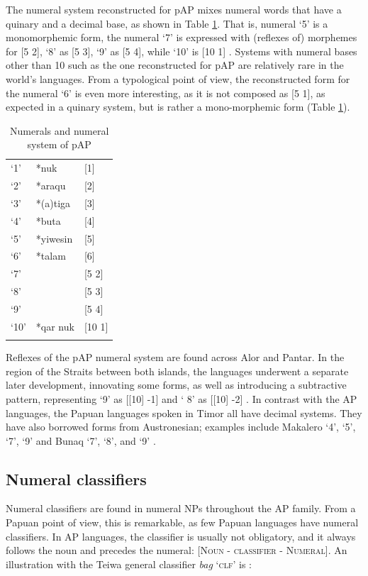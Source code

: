 The numeral system reconstructed for pAP mixes numeral words that have a quinary and a decimal base, as shown in Table \ref{tab:1:11}. That is, numeral `5' is a monomorphemic form, the numeral `7' is expressed with (reflexes of) morphemes for [5 2], `8' as [5 3], `9' as [5 4], while `10' is [10 1] \citep{SchapperEtAlTVnumeralsystems}. Systems with numeral bases other than 10 such as the one reconstructed for pAP are relatively rare in the world's languages. From a typological point of view, the reconstructed form for the numeral `6' is even more interesting, as it is not composed as [5 1], as expected in a quinary system, but is rather a mono-morphemic form (Table \ref{tab:1:11}).


\begin{table}[h]
\caption{Numerals and numeral system of pAP \citep{SchapperEtAlTVnumeralsystems}}
\label{tab:1:11}
\begin{tabular}{lll}      
\mytoprule
`1' & *nuk  &  [1] \\
`2' & *araqu   &  [2] \\
`3' & *(a)tiga  &  [3] \\
`4' & *buta  &  [4] \\
`5' & *yiwesin  &  [5]  \\
`6' & *talam  &  [6] \\
`7' &  &  [5 2] \\
`8' &  &  [5 3] \\
`9' &  &  [5 4] \\
`10' & *qar nuk  & [10 1] \\
\mybottomrule
\end{tabular}
\end{table}

Reflexes of the pAP numeral system are found across Alor and Pantar.  In the region of the Straits between both islands, the languages underwent a separate later development, innovating some forms, as well as introducing a subtractive pattern, representing `9' as [[10] -1] and ` 8' as [[10] -2] \citep{SchapperEtAlTVnumeralsystems}. In contrast with the AP languages, the Papuan languages spoken in Timor all have decimal systems. They have also borrowed forms from Austronesian; examples include Makalero `4', `5', `7', `9' \citep{Huber2011} and Bunaq `7', `8', and `9' \citep{Schapper2009}. 

\subsection{Numeral classifiers}\label{sec:1:6.3}
Numeral classifiers are found in numeral NPs throughout the AP family. From a Papuan point of view, this is remarkable, as few Papuan languages have numeral classifiers. In AP languages, the classifier is usually not obligatory, and it always follows the noun and precedes the numeral: \textsc{[Noun - classifier - Numeral]. A}n illustration with the Teiwa general classifier \textit{bag} `\textsc{clf}' is :



